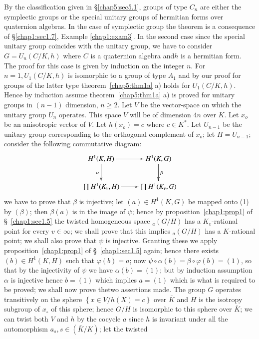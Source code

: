 By the classification given in \S \ref{chap5:sec5.1}, groups of
type $C_n$ are 
either the symplectic groups or the special unitary groups of
hermitian forms over quaternion algebras. In the case of symplectic
group the theorem is a consequence of \S \ref{chap1:sec1.7},
Example \ref{chap1:exam3}. In the
second case since the special unitary group coincides with the unitary
group, we have to consider $G = U_n(C/K, h)$ where $C$ is a quaternion
algebra and\pageoriginale $h$ is a hermitian form. The proof for this
case is given 
by induction on the integer $n$. For $n=1, U_1(C/K, h)$ is isomorphic
to a group of type $A_1$ and by our proof for groups of the latter
type theorem~\ref{chap5:thm1a} a) holds for $U_1 (C/K, h)$. Hence by induction
assume theorem~\ref{chap5:thm1a} a) is proved for unitary groups in $(n-1)$
dimension, $n\geq 2$. Let $V$ be the vector-space on which the unitary
group $U_n$ operates. This space $V$ will be of dimension $4n$ over
$K$. Let $x_o$ be an anisotropic vector of $V$. Let $h(x_o) = c$ where
$c \in K^*$. Let $U_{n-1} $ be the unitary group corresponding to the
orthogonal complement of  $x_o$; let $H = U_{n-1}$; consider the
following commutative diagram: 
\[
\xymatrix{
H^1 (K,H) \ar[r] \ar[d]_\alpha & H^1 (K,G) \ar[d]^\beta\\
\prod H^1 (K_v , H) \ar[r] & \prod H^1 (K_v, G)
}
\]
we have to prove that $\beta$ is injective; let $(a) \in H^1 (K, G)$
be mapped onto (1) by $(\beta)$; then $\beta(a)$ is in the image of
$\psi$;  hence by proposition~\ref{chap1:prop1} of \S~\ref{chap1:sec1.5} the
twisted homogeneous 
space $_a(G/H)$ has a $K_v$-rational point for every $v \in \infty$;
we shall prove that this implies $_a(G/H)$ has a $K$-rational point; we
shall also prove that $\psi$ is injective. Granting these we apply
proposition~\ref{chap1:prop1} of \S~\ref{chap1:sec1.5} again; hence
there exists 
$(b) \in H^1 (K, 
H)$ such that $\varphi (b) = a$; now $\psi \circ \alpha (b) = \beta
\circ \varphi
(b) = (1)$, so that by the injectivity of $\psi$ we have $\alpha (b) =
(1)$; but by induction assumption $\alpha$ is injective hence $b =
(1)$ which implies $a=(1)$ which is what is required to be proved; we
shall now prove the\pageoriginale two assertions made. The group $G$
operates 
transitively on the sphere $\left \{ x \in V \bigg/ h(X)=c \right \}$
over $\bar{K}$ and $H$ is the isotropy subgroup of $x_\circ$ of this
sphere; hence $G/H$ is isomorphic to this sphere over $\bar{K}$; we
can twist both $V$ and $h$ by the cocycle $a$ since $h$ is invariant
under all the automorphism $a_s, s \in (\bar{K}/K)$; let the twisted
